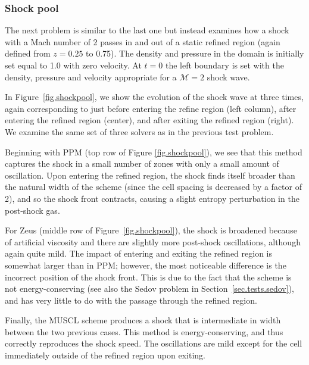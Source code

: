 \subsubsection{Shock pool}
\label{sec.tests.shockpool}

The next problem is similar to the last one but instead examines how a shock with a Mach number of 2 passes in and out of a static refined region (again defined from $z=0.25$ to 0.75).  The density and pressure in the domain is initially set equal to 1.0 with zero velocity.  At $t=0$ the left boundary is set with the density, pressure and velocity appropriate for a $\mathcal{M}=2$ shock wave.

In Figure~\ref{fig.shockpool}, we show the evolution of the shock wave at three times, again corresponding to just before entering the refine region (left column), after entering the refined region (center), and after exiting the refined region (right).  We examine the same set of three solvers as in the previous test problem.

Beginning with PPM (top row of Figure \ref{fig.shockpool}), we see that this method captures the shock in a small number of zones with only a small amount of oscillation.  Upon entering the refined region, the shock finds itself broader than the natural width of the scheme (since the cell spacing is decreased by a factor of 2), and so the shock front contracts, causing a slight entropy perturbation in the post-shock gas. 

For Zeus (middle row of Figure~\ref{fig.shockpool}), the shock is broadened because of artificial viscosity and there are slightly more post-shock oscillations, although again quite mild.  The impact of entering and exiting the refined region is somewhat larger than in PPM; however, the most noticeable difference is the incorrect position of the shock front. This is due to the fact that the scheme is not energy-conserving (see also the Sedov problem in Section~\ref{sec.tests.sedov}), and has very little to do with the passage through the refined region.

Finally, the MUSCL scheme produces a shock that is intermediate in width between the two previous cases.  This method is energy-conserving, and thus correctly reproduces the shock speed.  The oscillations are mild except for the cell immediately outside of the refined region upon exiting.

